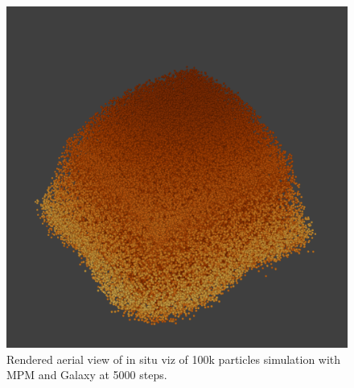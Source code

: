 \documentclass{vgtc}
\begin{document}
\begin{figure}
    \centering
    \includegraphics[width=\linewidth]{figs/100k-0249.png}
    \caption{Rendered aerial view of in situ viz of 100k particles simulation with MPM and Galaxy at 5000 steps.}
    \label{fig:100k}
\end{figure}
\end{document}
